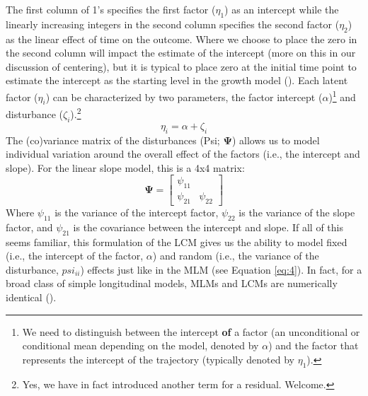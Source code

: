 \documentclass[11pt]{article}
\begin{document}
The first column of 1’s specifies the first factor ($\eta_{1}$) as an intercept while the linearly increasing integers in the second column specifies the second factor ($\eta_{2}$) as the linear effect of time on the outcome. Where we choose to place the zero in the second column will impact the estimate of the intercept (more on this in our discussion of centering), but it is typical to place zero at the initial time point to estimate the intercept as the starting level in the growth model (\cite{bollen_latent_2006}). Each latent factor ($\eta_{i}$) can be characterized by two parameters, the factor intercept ($\alpha$)\footnote{We need to distinguish between the intercept \textbf{of} a factor (an unconditional or conditional mean depending on the model, denoted by $\alpha$) and the factor that represents the intercept of the trajectory (typically denoted by $\eta_{1}$).} and disturbance ($\zeta_{i}$).\footnote{Yes, we have in fact introduced another term for a residual. Welcome.}
%
\begin{equation} \label{eq:10}
\eta_{i} = \alpha + \zeta_{i}
\end{equation}
%
The (co)variance matrix of the disturbances (Psi; $\boldsymbol{\Psi}$) allows us to model individual variation around the overall effect of the factors (i.e., the intercept and slope). For the linear slope model, this is a 4x4 matrix:
%
\begin{equation} \label{eq:11}
\boldsymbol{\Psi} = \left[ \begin{array}{cc} \psi_{11} & \\ \psi_{21} & \psi_{22} \end{array} \right] 
\end{equation}
%
Where $\psi_{11}$ is the variance of the intercept factor, $\psi_{22}$ is the variance of the slope factor, and $\psi_{21}$ is the covariance between the intercept and slope. If all of this seems familiar, this formulation of the LCM gives us the ability to model fixed (i.e., the intercept of the factor, $\alpha$) and random (i.e., the variance of the disturbance, $psi_{ii}$) effects just like in the MLM (see Equation \ref{eq:4}). In fact, for a broad class of simple longitudinal models, MLMs and LCMs are numerically identical (\cite{bauer_estimating_2003,curran_have_2003}).
\end{document}
